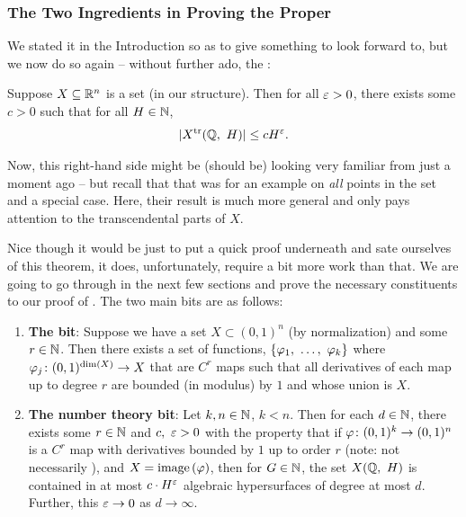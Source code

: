 \subsubsection{The Two Ingredients in Proving the \pwT Proper}

We stated it in the Introduction so as to give something to look forward to, but we now do so again -- without further ado, the \pwt:

  \begin{theorem}
    Suppose $\XRn[X]{n}$ is a  set (in our \om structure). Then for all $\eps > 0$, there exists some $c > 0$ such that for all $H \in \N$,
      \begin{align*}
        \card{\XtrQH[H]} \leq \bound[H].
      \end{align*}
      \label{thm:pwt}
  \end{theorem}

  Now, this right-hand side might be (should be) looking very familiar from just a moment ago -- but recall that that was for an example on \emph{all} points in the set and a special case. Here, their result is much more general and only pays attention to the transcendental parts of $X$.

  Nice though it would be just to put a quick proof underneath and sate ourselves of this theorem, it does, unfortunately, require a bit more work than that. We are going to go through in the next few sections and prove the necessary constituents to our proof of \pw. The two main bits are as follows:
  \begin{enumerate}

    \item \textbf{The \om bit}: Suppose we have a  set $X \subset (0, 1)^n$ (by normalization) and some $r \in \N$. Then there exists a set of functions, $\{ \vonevm{\phi}{k} \}$ where $\funcdom{\phi_j}{(0, 1)^{\dim{X}}}{X}$ that are $C^r$  maps such that all derivatives of each map up to degree $r$ are bounded (in modulus) by $1$ and whose union is $X$.
    \label{pw_proof:pt1}

    \item \textbf{The number theory bit}: Let $k, n \in \N$, $k < n$. Then for each $d \in \N$, there exists some $r \in \N$ and $c, \ \eps > 0$ with the property that if $\funcdom{\phi}{(0, 1)^k}{(0, 1)^n}$ is a $C^r$ map with derivatives bounded by $1$ up to order $r$ (note: not necessarily ), and $X = \image{\phi}$, then for $G \in \N$, the set $\XQH[H]$ is contained in at most $c \cdot H^{\eps}$ algebraic hypersurfaces of degree at most $d$. Further, this $\eps \to 0$ as $d \to \infty$.
    \label{pw_proof:pt2}

  \end{enumerate}

